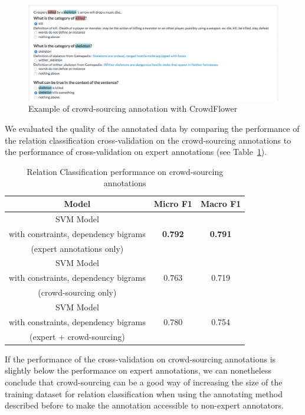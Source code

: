 \documentclass[12pt]{article}
\begin{document}
\begin{figure}[!ht]
   \centering \includegraphics[width=\linewidth]{Figures/Semantic_Parsing/crowdSourcing.png}
   \caption{\label{crowdSourcing} Example of crowd-sourcing annotation with CrowdFlower}
\end{figure}

We evaluated the quality of the annotated data by comparing the performance of the relation classification cross-validation on the crowd-sourcing annotations to the performance of cross-validation on expert annotations (see Table~\ref{crowdSourcingRelationClassification}).

\begin{table}[!ht]
\center
\begin{tabular}{c||c|c}
	Model & Micro F1 & Macro F1 \\
	\hline
	\hline
	SVM Model & & \\
	with constraints, dependency bigrams & \textbf{0.792} & \textbf{0.791} \\
	(expert annotations only) & & \\ \hline
	SVM Model & & \\
	with constraints, dependency bigrams & 0.763 & 0.719 \\
	(crowd-sourcing only) & & \\ \hline
	SVM Model & & \\
	with constraints, dependency bigrams & 0.780 & 0.754 \\
	(expert + crowd-sourcing) & & \\ \hline
\end{tabular}
\caption{\label{crowdSourcingRelationClassification} Relation Classification performance on crowd-sourcing annotations}
\end{table}

If the performance of the cross-validation on crowd-sourcing annotations is slightly below the performance on expert annotations, we can nonetheless conclude that crowd-sourcing can be a good way of increasing the size of the training dataset for relation classification when using the annotating method described before to make the annotation accessible to non-expert annotators.
\end{document}
